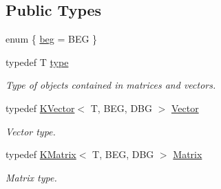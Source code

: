 \subsection*{Public Types}
\begin{DoxyCompactItemize}
\item 
enum \{ \mbox{\hyperlink{classKalman_1_1EKFilter_a0665fa7fa760b5235cb556e2503ff687aa3adf9ec22ed3a246105276c85a146c1}{beg}} = B\+EG
 \}
\item 
\mbox{\label{classKalman_1_1EKFilter_a851a633529f2cd75991b1858407011cd}} 
typedef T \mbox{\hyperlink{classKalman_1_1EKFilter_a851a633529f2cd75991b1858407011cd}{type}}
\begin{DoxyCompactList}\small\item\em Type of objects contained in matrices and vectors. \end{DoxyCompactList}\item 
\mbox{\label{classKalman_1_1EKFilter_af773d1217ecb01925b857d49b32bc636}} 
typedef \mbox{\hyperlink{classKalman_1_1KVector}{K\+Vector}}$<$ T, B\+EG, D\+BG $>$ \mbox{\hyperlink{classKalman_1_1EKFilter_af773d1217ecb01925b857d49b32bc636}{Vector}}
\begin{DoxyCompactList}\small\item\em Vector type. \end{DoxyCompactList}\item 
\mbox{\label{classKalman_1_1EKFilter_a7cbc4cb4d9139a7f241b27110426af43}} 
typedef \mbox{\hyperlink{classKalman_1_1KMatrix}{K\+Matrix}}$<$ T, B\+EG, D\+BG $>$ \mbox{\hyperlink{classKalman_1_1EKFilter_a7cbc4cb4d9139a7f241b27110426af43}{Matrix}}
\begin{DoxyCompactList}\small\item\em Matrix type. \end{DoxyCompactList}\end{DoxyCompactItemize}
